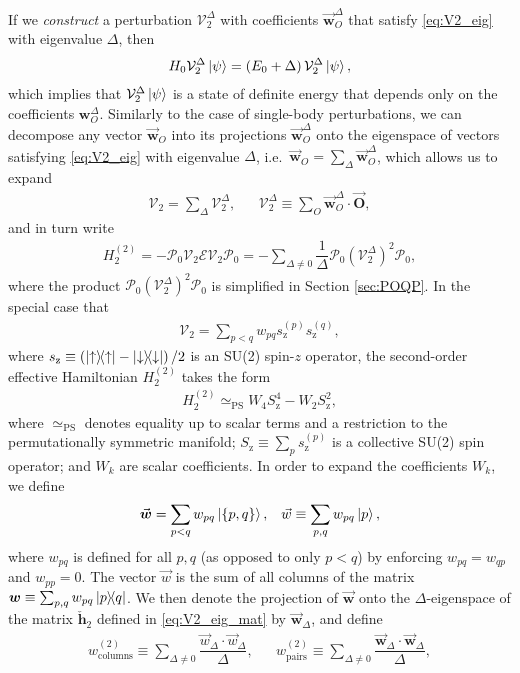 \documentclass[nofootinbib,notitlepage,11pt]{revtex4-2}
\renewcommand{\t}{\text} %
\newcommand{\f}[2]{\dfrac{#1}{#2}} %
\newcommand{\p}[1]{\left(#1\right)} %
\renewcommand{\set}[1]{\left\{#1\right\}} %
\renewcommand{\c}{\cdot} %
\newcommand{\m}{\bm} %
\renewcommand{\v}{\vec} %
\newcommand{\1}{\mathds{1}}
\newcommand{\up}{\uparrow}
\newcommand{\dn}{\downarrow}
\newcommand{\z}{\text{z}}
\newcommand{\E}{\mathcal{E}}
\renewcommand{\P}{\mathcal{P}}
\newcommand{\V}{\mathcal{V}}
\newcommand{\PS}{\text{PS}}
\begin{document}
If we {\it construct} a perturbation $\V_2^\Delta$ with coefficients
$\v{\m w}_O^\Delta$ that satisfy \eqref{eq:V2_eig} with eigenvalue
$\Delta$, then
\begin{align}
  H_0 \V_2^\Delta \ket\psi = \p{E_0 + \Delta} \V_2^\Delta \ket\psi,
\end{align}
which implies that $\V_2^\Delta\ket\psi$ is a state of definite energy
that depends only on the coefficients $\m w_O^\Delta$.  Similarly to
the case of single-body perturbations, we can decompose any vector
$\v{\m w}_O$ into its projections $\v{\m w}_O^\Delta$ onto the
eigenspace of vectors satisfying \eqref{eq:V2_eig} with eigenvalue
$\Delta$, i.e.~$\v{\m w}_O=\sum_\Delta\v{\m w}_O^\Delta$, which allows
us to expand
\begin{align}
  \V_2 = \sum_\Delta \V_2^\Delta,
  &&
  \V_2^\Delta \equiv \sum_O \v{\m w}_O^\Delta \c \v{\m O},
\end{align}
and in turn write
\begin{align}
  H_2^{(2)} = - \P_0 \V_2 \E \V_2 \P_0
  = -\sum_{\Delta\ne0} \f1\Delta \P_0 \p{\V_2^\Delta}^2 \P_0,
\end{align}
where the product $\P_0 \p{\V_2^\Delta}^2 \P_0$ is simplified in
Section \ref{sec:POQP}.  In the special case that
\begin{align}
  \V_2 = \sum_{p<q} w_{pq} s_\z^{(p)} s_\z^{(q)},
\end{align}
where $s_\z\equiv\p{\op\up-\op\dn}/2$ is an SU(2) spin-$z$ operator,
the second-order effective Hamiltonian $H_2^{(2)}$ takes the form
\begin{align}
  H_2^{(2)} \simeq_\PS W_4 S_\z^4 - W_2 S_\z^2,
\end{align}
where $\simeq_\PS$ denotes equality up to scalar terms and a
restriction to the permutationally symmetric manifold;
$S_\z\equiv\sum_p s_\z^{(p)}$ is a collective SU(2) spin operator; and
$W_k$ are scalar coefficients.  In order to expand the coefficients
$W_k$, we define
\begin{align}
  \v{\m w}=\sum_{p<q} w_{pq} \ket{\set{p,q}},
  &&
  \v w \equiv \sum_{p,q} w_{pq} \ket{p},
\end{align}
where $w_{pq}$ is defined for all $p,q$ (as opposed to only $p<q$) by
enforcing $w_{pq}=w_{qp}$ and $w_{pp}=0$.  The vector $\v w$ is the
sum of all columns of the matrix
$\m w\equiv\sum_{p,q}w_{pq}\op{p}{q}$.  We then denote the projection
of $\v{\m w}$ onto the $\Delta$-eigenspace of the matrix
$\check{\m h}_2$ defined in \eqref{eq:V2_eig_mat} by
$\v{\m w}_\Delta$, and define
\begin{align}
  w_{\t{columns}}^{(2)} \equiv \sum_{\Delta\ne0}
  \f{\v w_\Delta\c\v w_\Delta}{\Delta},
  &&
  w_{\t{pairs}}^{(2)} \equiv \sum_{\Delta\ne0}
  \f{\v{\m w}_\Delta\c\v{\m w}_\Delta}{\Delta},
\end{align}
\end{document}
